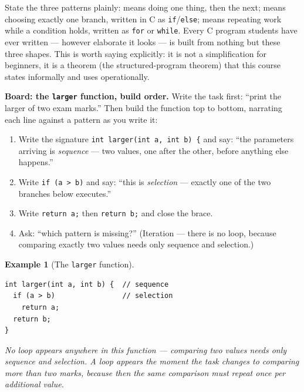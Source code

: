 \documentclass[11pt]{article}
\newtheorem{example}{Example}[section]
\begin{document}
State the three patterns plainly:  means doing one thing, then the next;  means choosing exactly one branch, written in C as \texttt{if}/\texttt{else};  means repeating work while a condition holds, written as \texttt{for} or \texttt{while}. Every C program students have ever written --- however elaborate it looks --- is built from nothing but these three shapes. This is worth saying explicitly: it is not a simplification for beginners, it is a theorem (the structured-program theorem) that this course states informally and uses operationally.

\textbf{Board: the \texttt{larger} function, build order.} Write the task first: ``print the larger of two exam marks.'' Then build the function top to bottom, narrating each line against a pattern as you write it:
\begin{enumerate}
  \item Write the signature \texttt{int larger(int a, int b) \{} and say: ``the parameters arriving is \emph{sequence} --- two values, one after the other, before anything else happens.''
  \item Write \texttt{if (a > b)} and say: ``this is \emph{selection} --- exactly one of the two branches below executes.''
  \item Write \texttt{return a;} then \texttt{return b;} and close the brace.
  \item Ask: ``which pattern is missing?'' (Iteration --- there is no loop, because comparing exactly two values needs only sequence and selection.)
\end{enumerate}

\begin{example}[The \texttt{larger} function]
\begin{verbatim}
int larger(int a, int b) {  // sequence
  if (a > b)                // selection
    return a;
  return b;
}
\end{verbatim}
No loop appears anywhere in this function --- comparing two values needs only sequence and selection. A loop appears the moment the task changes to comparing \emph{more than two} marks, because then the same comparison must repeat once per additional value.
\end{example}
\end{document}
